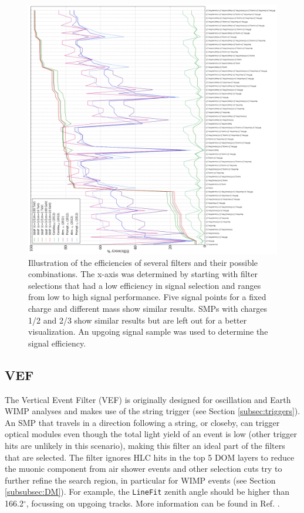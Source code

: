 \begin{figure}
\centering
\includegraphics[width=\textwidth,height=0.9\textheight]{chapter8/img/FilterRate_better_rotated}
\caption{Illustration of the efficiencies of several filters and their possible combinations. The x-axis was determined by starting with filter selections that had a low efficiency in signal selection and ranges from low to high signal performance. Five signal points for a fixed charge and different mass show similar results. SMPs with charges 1/2 and 2/3 show similar results but are left out for a better visualization. An upgoing signal sample was used to determine the signal efficiency.}
\label{fig:filterrate}
\end{figure}

\subsection{VEF}
The Vertical Event Filter (VEF) is originally designed for oscillation and Earth WIMP analyses and makes use of the string trigger (see Section \ref{subsec:triggers}). An SMP that travels in a direction following a string, or closeby, can trigger optical modules even though the total light yield of an event is low (other trigger hits are unlikely in this scenario), making this filter an ideal part of the filters that are selected. The filter ignores HLC hits in the top 5 DOM layers to reduce the muonic component from air shower events and other selection cuts try to further refine the search region, in particular for WIMP events (see Section \ref{subsubsec:DM}). For example, the \texttt{LineFit} zenith angle should be higher than 166.2$^\circ$, focussing on upgoing tracks. More information can be found in Ref. \cite{VEF2012}.

